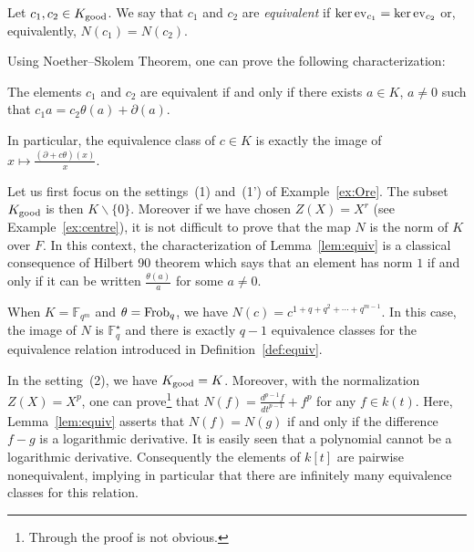 \documentclass[a4paper]{llncs}
\newcommand{\FF}{\mathbb F}
\newcommand{\End}{\textrm{\rm End}}
\newcommand{\Frob}{\textrm{\rm Frob}}
\newcommand{\ev}[1]{\textrm{\rm ev}_{#1}}
\newcommand{\bc}{\textbf{c}}
\newcommand{\good}{\textrm{\rm good}}
\begin{document}
\begin{definition}
\label{def:equiv}
Let $c_1, c_2 \in K_\good$.
We say that $c_1$ and $c_2$ are \emph{equivalent} if
$\ker \ev{c_1} = \ker \ev{c_2}$ or, equivalently, $N(c_1) = N(c_2)$.
\end{definition}

\noindent
Using Noether--Skolem Theorem, one can prove the following
characterization:

\begin{lemma}
\label{lem:equiv}
The elements $c_1$ and $c_2$ are equivalent if and only if there exists 
$a \in K$, $a \neq 0$ such that $c_1 a = c_2 \theta(a) + \partial(a)$.

\noindent
In particular, the equivalence class of $c \in K$ is exactly the image 
of $x \mapsto \frac{(\partial + c\theta)(x)} x$.
\end{lemma}

{\small
\begin{example}
\label{ex:equiv}
Let us first focus on the settings~(1) and~(1') of Example~\ref{ex:Ore}. 
The subset $K_\good$ is then $K \backslash \{0\}$. Moreover if we have 
chosen $Z(X) = X^r$ (see Example~\ref{ex:centre}), it is not difficult
to prove that the map $N$ is the norm of $K$ over $F$.
In this context, the characterization of Lemma~\ref{lem:equiv} is 
a classical consequence of Hilbert 90 theorem which says that an
element has norm $1$ if and only if it can be written 
$\frac{\theta(a)} a$ for some $a \neq 0$.

\noindent
When $K = \FF_{q^m}$ and $\theta = \Frob_q$, we have 
$N(c) = c^{1 + q + q^2 + \cdots + q^{m-1}}$. In this case, the image of 
$N$ is $\FF_q^\star$ and there is exactly $q{-}1$ equivalence classes 
for the equivalence relation introduced in Definition~\ref{def:equiv}.

In the setting~(2), we have $K_\good = K$. Moreover, with the 
normalization $Z(X) = X^p$, one can prove\footnote{Through the proof is 
not obvious.} that $N(f) = \frac {d^{p-1}f}{dt^{p-1}} + f^p$ for any $f 
\in k(t)$. Here, Lemma~\ref{lem:equiv} asserts that $N(f) = N(g)$ if
and only if the difference $f-g$ is a logarithmic derivative.
It is easily seen that a polynomial cannot be a logarithmic derivative.
Consequently the elements of $k[t]$ are pairwise nonequivalent,
implying in particular that there are infinitely many equivalence
classes for this relation.
\end{example}}

\end{document}
